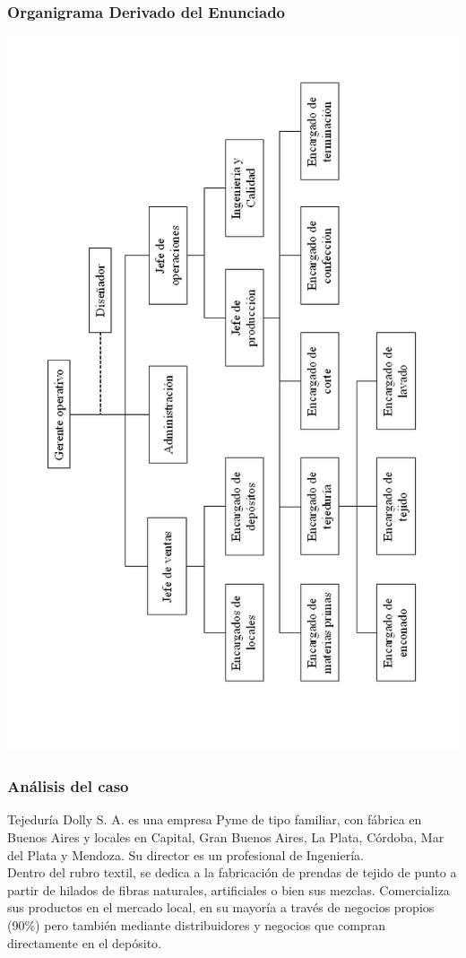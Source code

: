 \documentclass[a4paper,10pt,titlepage]{article}
\begin{document}
\subsubsection{Organigrama Derivado del Enunciado}
	\begin{center}
	\includegraphics[width=450pt]{./DollyOrnigrama.png}
	\end{center}


	\vspace{0.5cm}
\subsubsection{An\'{a}lisis del caso}

		\indent Tejedur\'{i}a Dolly S. A. es una empresa Pyme de tipo familiar, con f\'{a}brica en Buenos Aires y locales en Capital, Gran Buenos Aires, La Plata, C\'{o}rdoba, Mar del Plata y Mendoza. Su director es un profesional de Ingenier\'{i}a.\\
		\indent Dentro del rubro textil, se dedica a la fabricaci\'{o}n de prendas de tejido de punto a partir de hilados de fibras naturales, artificiales o bien sus mezclas. Comercializa sus productos en el mercado local, en su mayor\'{i}a a trav\'{e}s de negocios propios (90\%) pero tambi\'{e}n mediante distribuidores y negocios que compran directamente en el dep\'{o}sito.\\
		
\end{document}
